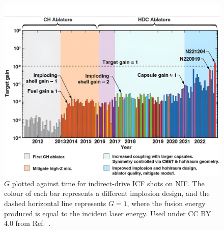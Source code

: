 \begin{figure}[t!]
    \includegraphics[width=\linewidth]{Introduction/Images/NIF_yields.jpg}
    \centering
    \caption{$G$ plotted against time for indirect-drive \ac{ICF} shots on \ac{NIF}.
    The colour of each bar represents a different implosion design, and the dashed horizontal line represents $G=1$, where the fusion energy produced is equal to the incident laser energy.
    Used under CC BY 4.0 from Ref.~\cite{abu-shawareb_achievement_2024}.
    }%
    \label{fig:intro_nif_yields}
\end{figure}

